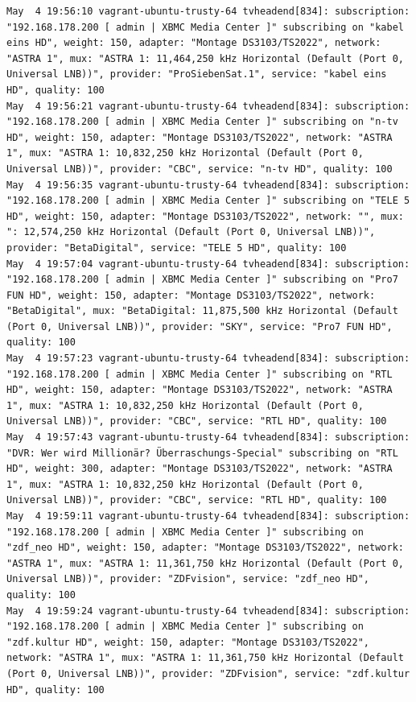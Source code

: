 \begin{cmd}[H]
\begin{Verbatim}[fontsize=\tiny]
May  4 19:56:10 vagrant-ubuntu-trusty-64 tvheadend[834]: subscription: "192.168.178.200 [ admin | XBMC Media Center ]" subscribing on "kabel eins HD", weight: 150, adapter: "Montage DS3103/TS2022", network: "ASTRA 1", mux: "ASTRA 1: 11,464,250 kHz Horizontal (Default (Port 0, Universal LNB))", provider: "ProSiebenSat.1", service: "kabel eins HD", quality: 100
May  4 19:56:21 vagrant-ubuntu-trusty-64 tvheadend[834]: subscription: "192.168.178.200 [ admin | XBMC Media Center ]" subscribing on "n-tv HD", weight: 150, adapter: "Montage DS3103/TS2022", network: "ASTRA 1", mux: "ASTRA 1: 10,832,250 kHz Horizontal (Default (Port 0, Universal LNB))", provider: "CBC", service: "n-tv HD", quality: 100
May  4 19:56:35 vagrant-ubuntu-trusty-64 tvheadend[834]: subscription: "192.168.178.200 [ admin | XBMC Media Center ]" subscribing on "TELE 5 HD", weight: 150, adapter: "Montage DS3103/TS2022", network: "", mux: ": 12,574,250 kHz Horizontal (Default (Port 0, Universal LNB))", provider: "BetaDigital", service: "TELE 5 HD", quality: 100
May  4 19:57:04 vagrant-ubuntu-trusty-64 tvheadend[834]: subscription: "192.168.178.200 [ admin | XBMC Media Center ]" subscribing on "Pro7 FUN HD", weight: 150, adapter: "Montage DS3103/TS2022", network: "BetaDigital", mux: "BetaDigital: 11,875,500 kHz Horizontal (Default (Port 0, Universal LNB))", provider: "SKY", service: "Pro7 FUN HD", quality: 100
May  4 19:57:23 vagrant-ubuntu-trusty-64 tvheadend[834]: subscription: "192.168.178.200 [ admin | XBMC Media Center ]" subscribing on "RTL HD", weight: 150, adapter: "Montage DS3103/TS2022", network: "ASTRA 1", mux: "ASTRA 1: 10,832,250 kHz Horizontal (Default (Port 0, Universal LNB))", provider: "CBC", service: "RTL HD", quality: 100
May  4 19:57:43 vagrant-ubuntu-trusty-64 tvheadend[834]: subscription: "DVR: Wer wird Millionär? Überraschungs-Special" subscribing on "RTL HD", weight: 300, adapter: "Montage DS3103/TS2022", network: "ASTRA 1", mux: "ASTRA 1: 10,832,250 kHz Horizontal (Default (Port 0, Universal LNB))", provider: "CBC", service: "RTL HD", quality: 100
May  4 19:59:11 vagrant-ubuntu-trusty-64 tvheadend[834]: subscription: "192.168.178.200 [ admin | XBMC Media Center ]" subscribing on "zdf_neo HD", weight: 150, adapter: "Montage DS3103/TS2022", network: "ASTRA 1", mux: "ASTRA 1: 11,361,750 kHz Horizontal (Default (Port 0, Universal LNB))", provider: "ZDFvision", service: "zdf_neo HD", quality: 100
May  4 19:59:24 vagrant-ubuntu-trusty-64 tvheadend[834]: subscription: "192.168.178.200 [ admin | XBMC Media Center ]" subscribing on "zdf.kultur HD", weight: 150, adapter: "Montage DS3103/TS2022", network: "ASTRA 1", mux: "ASTRA 1: 11,361,750 kHz Horizontal (Default (Port 0, Universal LNB))", provider: "ZDFvision", service: "zdf.kultur HD", quality: 100

\end{Verbatim}
\end{cmd}
